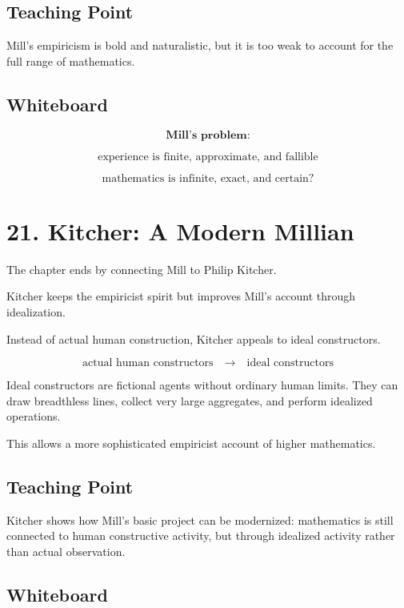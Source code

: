 \documentclass[11pt]{article}
\begin{document}
\subsection*{Teaching Point}

Mill's empiricism is bold and naturalistic, but it is too weak to account for the full range
of mathematics.

\subsection*{Whiteboard}

\[
\textbf{Mill's problem:}
\]

\[
\text{experience is finite, approximate, and fallible}
\]

\[
\text{mathematics is infinite, exact, and certain?}
\]

\section*{21. Kitcher: A Modern Millian}

The chapter ends by connecting Mill to Philip Kitcher.

Kitcher keeps the empiricist spirit but improves Mill's account through idealization.

Instead of actual human construction, Kitcher appeals to ideal constructors.

\[
\text{actual human constructors}
\quad \longrightarrow \quad
\text{ideal constructors}
\]

Ideal constructors are fictional agents without ordinary human limits. They can draw
breadthless lines, collect very large aggregates, and perform idealized operations.

This allows a more sophisticated empiricist account of higher mathematics.

\subsection*{Teaching Point}

Kitcher shows how Mill's basic project can be modernized: mathematics is still connected
to human constructive activity, but through idealized activity rather than actual observation.

\subsection*{Whiteboard}
\end{document}
